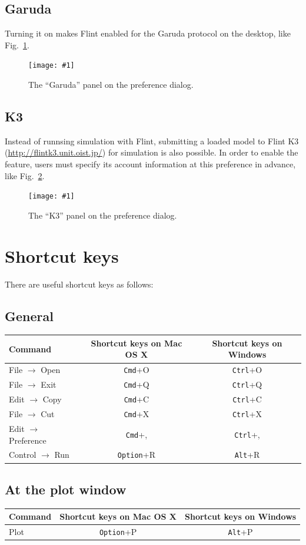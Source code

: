 \documentclass[a4paper,10pt]{report}
\newcommand\FigureOfImage[2]{\begin{figure}[h]
  \centering
  \texttt{[image: \#1]}
  \caption{#2}\label{fig:#1}
\end{figure}}
\begin{document}
\subsection{Garuda}
\label{subsec:Garuda}
Turning it on makes Flint enabled for the Garuda protocol on the desktop, like
Fig.~\ref{fig:preference-garuda}.
\FigureOfImage{preference-garuda}{The ``Garuda'' panel on the preference dialog.}

\subsection{K3}
Instead of runnsing simulation with Flint, submitting a loaded model to Flint K3
(\url{http://flintk3.unit.oist.jp/}) for simulation is also possible.
In order to enable the feature, users must specify its account information at
this preference in advance, like Fig.~\ref{fig:preference-k3}.
\FigureOfImage{preference-k3}{The ``K3'' panel on the preference dialog.}

\section{Shortcut keys}
There are useful shortcut keys as follows:

\subsection{General}
\begin{tabular}{l||c|c}
  Command & Shortcut keys on Mac OS X & Shortcut keys on Windows \\
  \hline
  File $\rightarrow$ Open & {\tt Cmd}+O & {\tt Ctrl}+O \\
  File $\rightarrow$ Exit & {\tt Cmd}+Q & {\tt Ctrl}+Q \\
  Edit $\rightarrow$ Copy & {\tt Cmd}+C & {\tt Ctrl}+C \\
  File $\rightarrow$ Cut  & {\tt Cmd}+X & {\tt Ctrl}+X \\
  Edit $\rightarrow$ Preference & {\tt Cmd}+, & {\tt Ctrl}+, \\
  Control $\rightarrow$ Run & {\tt Option}+R & {\tt Alt}+R \\
\end{tabular}

\subsection{At the plot window}
\begin{tabular}{l||c|c}
  Command & Shortcut keys on Mac OS X & Shortcut keys on Windows \\
  \hline
  Plot & {\tt Option}+P & {\tt Alt}+P \\
\end{tabular}
\end{document}
